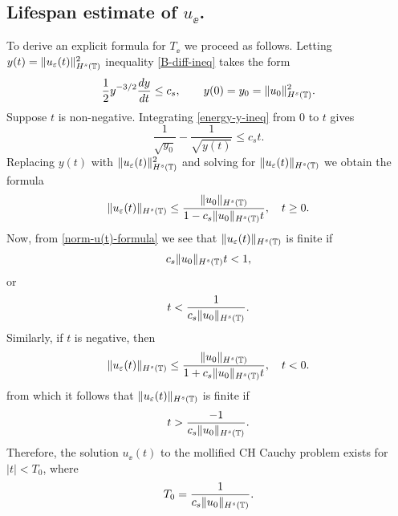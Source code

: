 	\subsection{  Lifespan estimate of $u_\ee$.} To derive an explicit formula for
	$T_\ee$ we proceed as follows.  Letting  $y(t)=
	\|u_\varepsilon(t)\|_{H^s(\mathbb{T})}^2$ inequality  \eqref{B-diff-ineq} takes the
	form
	\begin{equation} 
		\label{energy-y-ineq}
		\frac 12
		y^{-3/2}\frac{dy}{dt}
		\le
		c_s,
		\qquad
		y(0)=y_0=  \|u_0\|_{H^s(\mathbb{T})}^2.
	\end{equation}
	Suppose $t$ is non-negative. Integrating  \eqref{energy-y-ineq} from  0  to $t$ gives
	\begin{equation} 
		\label{energy-y-ineq-calc1}
		\frac{1}{\sqrt{y_0}}  - \frac{1}{\sqrt{y(t)}} 
		\le
		c_s t.
	\end{equation}
	Replacing $y(t)$ with   $\|u_\varepsilon(t)\|_{H^s(\mathbb{T})}^2$  and solving for  $\|u_\varepsilon(t)\|_{H^s(\mathbb{T})}$
	we obtain the formula
	\begin{equation} 
		\label{norm-u(t)-formula}
		\|u_\varepsilon(t)\|_{H^s(\mathbb{T})}
		\le
		\frac{ \|u_0\|_{H^s(\mathbb{T})}}{1-c_s\|u_0\|_{H^s(\mathbb{T})} t}, \quad t\ge
		0.
	\end{equation}
	Now, from \eqref{norm-u(t)-formula} we see that  $\|u_\varepsilon(t)\|_{H^s(\mathbb{T})}$ is finite  if 
	\begin{equation*} 
		\label{Lifespan-calc1}
		c_s    \|u_0\|_{H^s(\mathbb{T})} t<1,
	\end{equation*}
	or
	\begin{equation} 
		t
		<
		\frac{1}{ c_s \|u_0\|_{H^s(\mathbb{T})}}.
	\end{equation}
	Similarly, if $t$ is negative, then 
	\begin{equation} 
		\label{norm-u(t)-formula-prime}
		\|u_\varepsilon(t)\|_{H^s(\mathbb{T})}
		\le
		\frac{ \|u_0\|_{H^s(\mathbb{T})}}{1+c_s\|u_0\|_{H^s(\mathbb{T})} t}, \quad t < 0.
	\end{equation}
	from which it follows that $\|u_\varepsilon(t)\|_{H^s(\mathbb{T})}$ is finite  if 
	\begin{equation} 
		t
		>
		 \frac{-1}{ c_s \|u_0\|_{H^s(\mathbb{T})}}.
	\end{equation}
	Therefore, the  solution  $u_\ee(t)$ to the mollified CH Cauchy
	problem exists for $|t| <T_0$, where
	\begin{equation} 
		\label{CH-Lifespan}
		T_0
		=
		\frac{1}{ c_s \|u_0\|_{H^s(\mathbb{T})}}.
	\end{equation}
	\noindent
